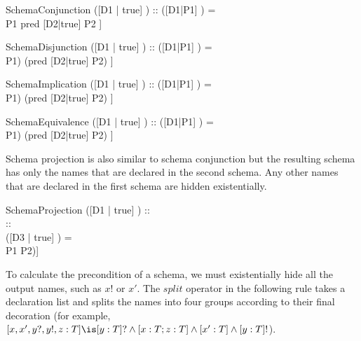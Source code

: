 \begin{zedrule}{SchemaConjunction}
  ([D1 | true] \land [D2 | true]) :: \power [D3 | true]
\derives
  ([D1|P1] \land [D2|P2]) = \\ [D3 | pred [D1|true] \land P1 \land
                                  pred [D2|true] \land P2 ]
\end{zedrule}

\begin{zedrule}{SchemaDisjunction}
  ([D1 | true] \land [D2 | true]) :: \power [D3 | true]
\derives
  ([D1|P1] \lor [D2|P2]) = \\ [D3 | (pred [D1|true] \land P1) \lor
                                  (pred [D2|true] \land P2) ]
\end{zedrule}

\begin{zedrule}{SchemaImplication}
  ([D1 | true] \land [D2 | true]) :: \power [D3 | true]
\derives
  ([D1|P1] \implies [D2|P2]) = \\ [D3 | (pred [D1|true] \land P1) \implies
                                     (pred [D2|true] \land P2) ]
\end{zedrule}

\begin{zedrule}{SchemaEquivalence}
  ([D1 | true] \land [D2 | true]) :: \power [D3 | true]
\derives
  ([D1|P1] \iff [D2|P2]) = \\ [D3 | (pred [D1|true] \land P1) \iff
                                 (pred [D2|true] \land P2) ]
\end{zedrule}

Schema projection is also similar to schema conjunction but the
resulting schema has only the names that are declared in the second
schema.  Any other names that are declared in the first schema are
hidden existentially.

\begin{zedrule}{SchemaProjection}
  ([D1 | true] \land [D2 | true]) :: \power [D3 | true] \\
  [D2 | true] :: \power [D4 | true] \\
  ([D3 | true] \schemaminus [D4 | true]) \is [D5 | true]
\derives
  [D1|P1] \project [D2|P2] = \\
  [D2 | (\exists D5 @ pred [D1|true] \land P1 \land P2)]
\end{zedrule}

To calculate the precondition of a schema, we must existentially hide
all the output names, such as $x!$ or $x'$.  The $split$ operator in
the following rule takes a declaration list and splits the names into
four groups according to their final decoration (for example, $[x, x',
y?, y!, z:T] \is [y:T]? \land [x:T; z:T] \land [x':T]\land [y:T]!$).


